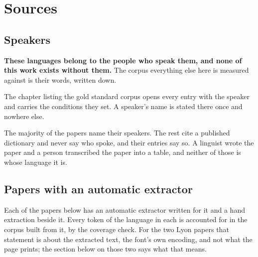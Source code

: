 \chapter{Sources}

\section{Speakers}

\textbf{These languages belong to the people who speak them, and none of this work exists without them.} The corpus everything else here is measured against is their words, written down.

The chapter listing the gold standard corpus opens every entry with the speaker and carries the conditions they set. A speaker's name is stated there once and nowhere else.

The majority of the papers name their speakers. The rest cite a published dictionary and never say who spoke, and their entries say so. A linguist wrote the paper and a person transcribed the paper into a table, and neither of those is whose language it is.

\section{Papers with an automatic extractor}

Each of the papers below has an automatic extractor written for it and a hand extraction beside it. Every token of the language in each is accounted for in the corpus built from it, by the coverage check. For the two Lyon papers that statement is about the extracted text, the font's own encoding, and not what the page prints; the section below on those two says what that means.

